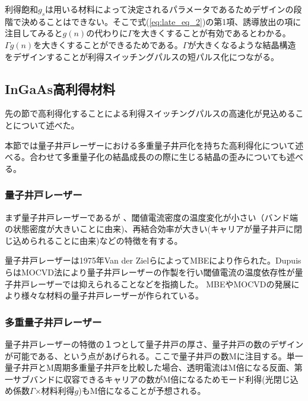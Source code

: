 利得飽和$g_{s}$は用いる材料によって決定されるパラメータであるためデザインの段階で決めることはできない。そこで式(\ref{eq:late_eq_2})の第1項、誘導放出の項に注目してみると$g(n)$の代わりに$\Gamma$を大きくすることが有効であるとわかる。$\Gamma g(n)$を大きくすることができるためである。$\Gamma$が大きくなるような結晶構造をデザインすることが利得スイッチングパルスの短パルス化につながる。
\clearpage
\subsection{InGaAs高利得材料}
先の節で高利得化することによる利得スイッチングパルスの高速化が見込めることについて述べた。

本節では量子井戸レーザーにおける多重量子井戸化を持ちた高利得化について述べる。合わせて多重量子化の結晶成長のの際に生じる結晶の歪みについても述べる。
\subsubsection{量子井戸レーザー}
まず量子井戸レーザーであるが
、閾値電流密度の温度変化が小さい（バンド端の状態密度が大きいことに由来)、再結合効率が大きい(キャリアが量子井戸に閉じ込められることに由来)などの特徴を有する。


量子井戸レーザーは1975年Van der ZielらによってMBEにより作られた\cite{ref_van}。DupuisらはMOCVD法により量子井戸レーザーの作製を行い閾値電流の温度依存性が量子井戸レーザーでは抑えられることなどを指摘した\cite{ref_dupuis}。%
MBEやMOCVDの発展により様々な材料の量子井戸レーザーが作られている。
\subsubsection{多重量子井戸レーザー}
量子井戸レーザーの特徴の１つとして量子井戸の厚さ、量子井戸の数のデザインが可能である、という点があげられる。ここで量子井戸の数Mに注目する。単一量子井戸とM周期多重量子井戸を比較した場合、透明電流はM倍になる反面、第一サブバンドに収容できるキャリアの数がM倍になるためモード利得(光閉じ込め係数$\Gamma$×材料利得$g$)もM倍になることが予想される。

